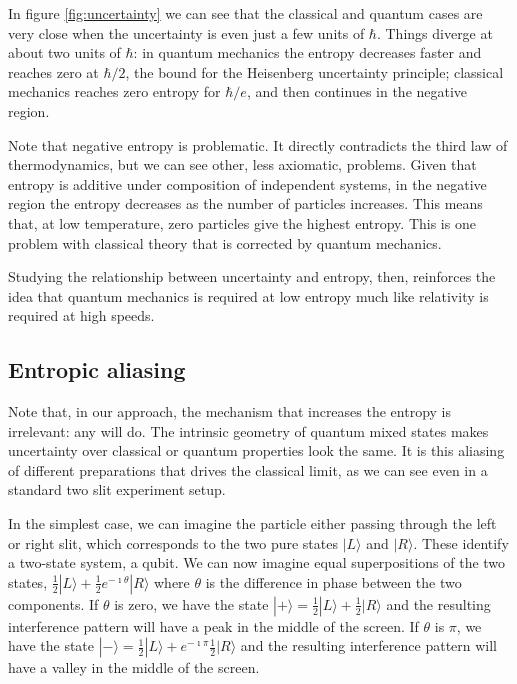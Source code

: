 \documentclass{article}
\def\>{\rangle}
\begin{document}
In figure \ref{fig:uncertainty} we can see that the classical and quantum cases are very close when the uncertainty is even just a few units of $\hbar$. Things diverge at about two units of $\hbar$: in quantum mechanics the entropy decreases faster and reaches zero at $\hbar/2$, the bound for the Heisenberg uncertainty principle; classical mechanics reaches zero entropy for $\hbar/e$, and then continues in the negative region.

Note that negative entropy is problematic. It directly contradicts the third law of thermodynamics, but we can see other, less axiomatic, problems. Given that entropy is additive under composition of independent systems, in the negative region the entropy decreases as the number of particles increases. This means that, at low temperature, zero particles give the highest entropy. This is one problem with classical theory that is corrected by quantum mechanics.

Studying the relationship between uncertainty and entropy, then, reinforces the idea that quantum mechanics is required at low entropy much like relativity is required at high speeds.

\subsection{Entropic aliasing}

Note that, in our approach, the mechanism that increases the entropy is irrelevant: any will do. The intrinsic geometry of quantum mixed states makes uncertainty over classical or quantum properties look the same. It is this aliasing of different preparations that drives the classical limit, as we can see even in a standard two slit experiment setup. 

In the simplest case, we can imagine the particle either passing through the left or right slit, which corresponds to the two pure states $|L\>$ and $|R\>$. These identify a two-state system, a qubit. We can now imagine equal superpositions of the two states, $\frac{1}{2}|L\> + \frac{1}{2} e^{-\imath \theta} |R\>$ where $\theta$ is the difference in phase between the two components. If $\theta$ is zero, we have the state $|+\> = \frac{1}{2}|L\> + \frac{1}{2} |R\>$ and the resulting interference pattern will have a peak in the middle of the screen. If $\theta$ is $\pi$, we have the state $|-\> = \frac{1}{2}|L\> + e^{-\imath \pi}\frac{1}{2} |R\>$ and the resulting interference pattern will have a valley in the middle of the screen.
\end{document}
